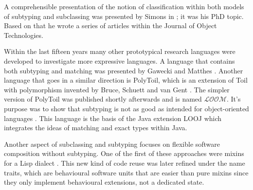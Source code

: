 A comprehensible presentation of the notion of classification within
both models of subtyping and subclassing was presented by Simons in
\cite{simons_theory_2002-2}; it was his PhD topic. Based on that he wrote a series of
articles within the Journal of Object Technologies.

Within the last fifteen years many other prototypical research
languages were developed to investigate more expressive languages. A
language that contains both subtyping and matching was presented
by Gawecki and Matthes \cite{gawecki_tool:_1995}. Another language
that goes in a similar direction is PolyToil, which is an extension
of Toil with polymorphism invented by Bruce, Schuett and van Gent
\cite{bruce_polytoil:_1995}. The simpler version of PolyToil was
published shortly afterwards and is named $\mathcal{LOOM}$. It's purpose was to show
that subtyping is not as good as intended for object-oriented languages
\cite{bruce_subtyping_1997}. This language is the basis of the Java
extension LOOJ which integrates the ideas of matching and exact types
within Java.

Another aspect of subclassing and subtyping focuses
on flexible software composition without subtyping. One
of the first of these approaches were mixins for a Lisp dialect
\cite{bracha_mixin-based_1990}. This new kind of code reuse
was later refined under the name traits, which are behavioural software
units \cite{schaerli_traits:_2003,ducasse_traits:_2006} that are easier
than pure mixins since they only implement behavioural extensions,
not a dedicated state.

